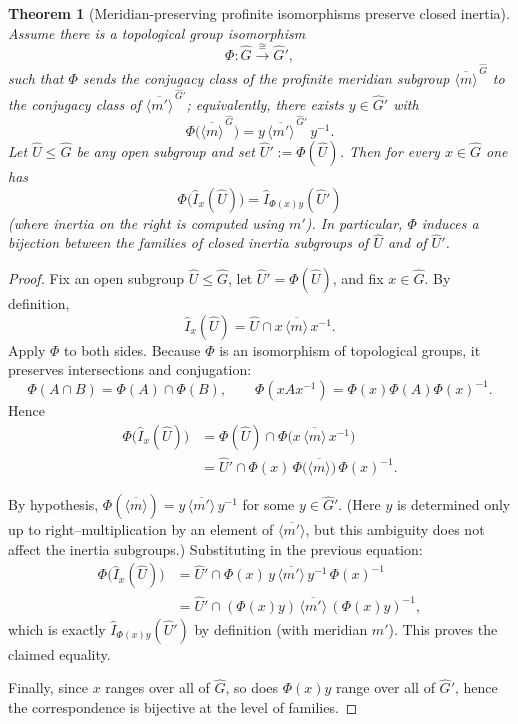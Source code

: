 \documentclass[10pt,a4paper]{amsart}
\newtheorem{theorem}{Theorem}
\begin{document}
	\begin{theorem}[Meridian-preserving profinite isomorphisms preserve closed inertia]\label{thm:profinite-inertia-rigidity}
		Assume there is a topological group isomorphism
		\[\Phi:\widehat G \xrightarrow{\ \cong\ } \widehat G',\] such that $\Phi$ sends the conjugacy class of the profinite meridian subgroup $\overline{\langle m\rangle}^{\,\widehat G}$ to the conjugacy class of $\overline{\langle m'\rangle}^{\,\widehat G'}$; equivalently, there exists $y\in \widehat G'$ with
		\[ \Phi\big(\overline{\langle m\rangle}^{\,\widehat G}\big)= y\,\overline{\langle m'\rangle}^{\,\widehat G'}\,y^{-1}.\]
		Let $\widehat U\le \widehat G$ be any open subgroup and set $\widehat U':=\Phi(\widehat U)$.
		Then for every $x\in \widehat G$ one has
		\[ \Phi\big(\widehat I_x(\widehat U)\big)=\widehat I_{\Phi(x)y}(\widehat U')\]
		(where inertia on the right is computed using $m'$). In particular, $\Phi$ induces a bijection between the families of closed inertia subgroups of $\widehat U$ and of $\widehat U'$.
	\end{theorem}

	\begin{proof}
		Fix an open subgroup $\widehat U\le \widehat G$, let $\widehat U'=\Phi(\widehat U)$, and fix $x\in \widehat G$. By definition,
		\[ \widehat I_x(\widehat U)=\widehat U\cap x\,\overline{\langle m\rangle}\,x^{-1}.\]
		Apply $\Phi$ to both sides. Because $\Phi$ is an isomorphism of topological groups, it preserves intersections and conjugation:
		\[ \Phi(A\cap B)=\Phi(A)\cap \Phi(B),\qquad \Phi(xAx^{-1})=\Phi(x)\Phi(A)\Phi(x)^{-1}.\]
		Hence
		\begin{align*}
			\Phi\big(\widehat I_x(\widehat U)\big) &= \Phi(\widehat U)\cap \Phi\big(x\,\overline{\langle m\rangle}\,x^{-1}\big) \\
			&= \widehat U'\cap \Phi(x)\,\Phi\big(\overline{\langle m\rangle}\big)\,\Phi(x)^{-1}.
		\end{align*}
		
		By hypothesis, $\Phi(\overline{\langle m\rangle})=y\,\overline{\langle m'\rangle}\,y^{-1}$ for some $y\in \widehat G'$. (Here $y$ is determined only up to right--multiplication by an element of $\overline{\langle m'\rangle}$, but this ambiguity does not affect the inertia subgroups.) Substituting in the previous equation:
		\begin{align*}
			\Phi\big(\widehat I_x(\widehat U)\big) &= \widehat U'\cap \Phi(x)\,y\,\overline{\langle m'\rangle}\,y^{-1}\,\Phi(x)^{-1} \\
			&= \widehat U'\cap (\Phi(x)y)\,\overline{\langle m'\rangle}\,(\Phi(x)y)^{-1},
		\end{align*}
		which is exactly $\widehat I_{\Phi(x)y}(\widehat U')$ by definition (with meridian $m'$). This proves the claimed equality.
		
		Finally, since $x$ ranges over all of $\widehat G$, so does $\Phi(x)y$ range over all of $\widehat G'$, hence the correspondence is bijective at the level of families.
	\end{proof}
\end{document}
